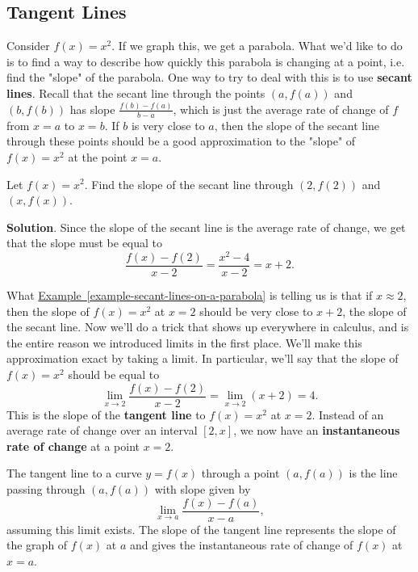 \documentclass[10pt,]{book}
\newcommand{\terminology}[1]{\textbf{#1}}
\theoremstyle{ptxplainnotitle}
\theoremstyle{ptxplaintitle}
\theoremstyle{ptxplainnotitle}
\theoremstyle{ptxplaintitle}
\theoremstyle{ptxplainnotitle}
\theoremstyle{ptxplaintitle}
\theoremstyle{ptxdefinitionnotitle}
\theoremstyle{ptxdefinitiontitle}
\theoremstyle{ptxdefinitionnotitle}
\theoremstyle{ptxdefinitiontitle}
\theoremstyle{ptxdefinitionnotitle}
\theoremstyle{ptxdefinitiontitle}
\theoremstyle{ptxdefinitionnotitle}
\theoremstyle{ptxdefinitiontitle}
\theoremstyle{ptxdefinitionnotitle}
\theoremstyle{ptxdefinitiontitle}
\numberwithin{equation}{section}
\begin{document}
\subsection[{Tangent Lines}]{Tangent Lines}\label{subsection-tangent-lines}
\hypertarget{p-75}{}%
Consider \(f(x) = x^{2}\). If we graph this, we get a parabola. What we'd like to do is to find a way to describe how quickly this parabola is changing at a point, i.e. find the "slope" of the parabola. One way to try to deal with this is to use \terminology{secant lines}. Recall that the secant line through the points \((a,f(a))\) and \((b,f(b))\) has slope \(\frac{f(b) - f(a)}{b-a}\), which is just the average rate of change of \(f\) from \(x=a\) to \(x=b\). If \(b\) is very close to \(a\), then the slope of the secant line through these points should be a good approximation to the "slope" of \(f(x) = x^{2}\) at the point \(x=a\).%
\begin{example}\label{example-secant-lines-on-a-parabola}
\hypertarget{p-76}{}%
Let \(f(x) = x^{2}\). Find the slope of the secant line through \((2,f(2))\) and \((x,f(x))\).%
\par\smallskip%
\noindent\textbf{Solution}.\hypertarget{solution-16}{}\quad%
\hypertarget{p-77}{}%
Since the slope of the secant line is the average rate of change, we get that the slope must be equal to%
\begin{equation*}
\frac{f(x) - f(2)}{x-2} = \frac{x^{2} - 4}{x-2} = x+2.
\end{equation*}
%
\end{example}
\hypertarget{p-78}{}%
What \hyperref[example-secant-lines-on-a-parabola]{Example~\ref{example-secant-lines-on-a-parabola}} is telling us is that if \(x\approx2\), then the slope of \(f(x) = x^{2}\) at \(x=2\) should be very close to \(x+2\), the slope of the secant line. Now we'll do a trick that shows up everywhere in calculus, and is the entire reason we introduced limits in the first place. We'll make this approximation exact by taking a limit. In particular, we'll say that the slope of \(f(x) = x^{2}\) should be equal to%
\begin{equation*}
\lim_{x\to2}\frac{f(x)-f(2)}{x-2} = \lim_{x\to2}(x+2) = 4.
\end{equation*}
This is the slope of the \terminology{tangent line} to \(f(x) = x^{2}\) at \(x=2\). Instead of an average rate of change over an interval \([2,x]\), we now have an \terminology{instantaneous rate of change} at a point \(x=2\).%
\begin{definition}\label{definition-tangent-lines}
\hypertarget{p-79}{}%
The tangent line to a curve \(y=f(x)\) through a point \((a,f(a))\) is the line passing through \((a,f(a))\) with slope given by%
\begin{equation*}
\lim_{x\to a}\frac{f(x)-f(a)}{x-a},
\end{equation*}
assuming this limit exists. The slope of the tangent line represents the slope of the graph of \(f(x)\) at \(a\) and gives the instantaneous rate of change of \(f(x)\) at \(x=a\).%
\end{definition}
\end{document}
